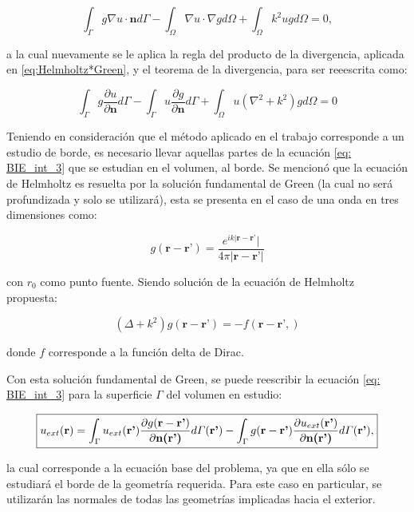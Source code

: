 \documentclass[12pt,letterpaper]{article}
\numberwithin{equation}{section}
\begin{document}
\begin{equation}
\int_{\Gamma}g\nabla u\cdot\textbf{n}d\varGamma-\int_{\Omega}\nabla u\cdot\nabla g d\varOmega+\int_{\Omega}k^2ugd\varOmega=0,
\label{eq: BIE_int_2}
\end{equation}

\noindent a la cual nuevamente se le aplica la regla del producto de la divergencia, aplicada en \ref{eq:Helmholtz*Green}, y el teorema de la divergencia, para ser reeescrita como:

\begin{equation}
\int_{\Gamma}g\frac{\partial u}{\partial\textbf{n}}d\varGamma-\int_{\Gamma}u\frac{\partial g}{\partial\textbf{n}}d\varGamma+\int_{\Omega}u(\nabla^2+k^2)gd\varOmega=0
\label{eq: BIE_int_3}
\end{equation}

Teniendo en consideración que el método aplicado en el trabajo corresponde a un estudio de borde, es necesario llevar aquellas partes de la ecuación \ref{eq: BIE_int_3} que se estudian en el volumen, al borde. 
Se mencionó que la ecuación de Helmholtz es resuelta por la solución fundamental de Green (la cual no será profundizada y solo se utilizará), esta se presenta en el caso de una onda en tres dimensiones como: 

$$g(\textbf{r}-\textbf{r'})=\frac{e^{ik|\textbf{r}-\textbf{r'}}|}{4\pi |\textbf{r}-\textbf{r'}|}$$

\noindent con $r_{0}$ como punto fuente. Siendo solución de la ecuación de Helmholtz propuesta:

\begin{equation}
(\Delta+k^2)g(\textbf{r}-\textbf{r'})=-f(\textbf{r}-\textbf{r'},)
\label{eq:Helmholtz green}
\end{equation}

donde $f$ corresponde a la función delta de Dirac.

Con esta solución fundamental de Green, se puede reescribir la ecuación \ref{eq: BIE_int_3} para la superficie $\Gamma$ del volumen en estudio:

\begin{equation}
\boxed{
	u_{ext}(\textbf{r})=\int_{\Gamma}u_{ext}(\textbf{r'})\frac{\partial g(\textbf{r}-\textbf{r'})}{\partial\textbf{n(\textbf{r'})}}d\varGamma(\textbf{r'}) - \int_{\Gamma}g(\textbf{r}-\textbf{r'})\frac{\partial u_{ext}(\textbf{r'})}{\partial\textbf{n(\textbf{r'})}}d\varGamma(\textbf{r'}),
	\label{eq: BIE_ext}
}	
\end{equation}

\noindent la cual corresponde a la ecuación base del problema, ya que en ella sólo se estudiará el borde de la geometría requerida. Para este caso en particular, se utilizarán las normales de todas las geometrías implicadas hacia el exterior. 
\end{document}
